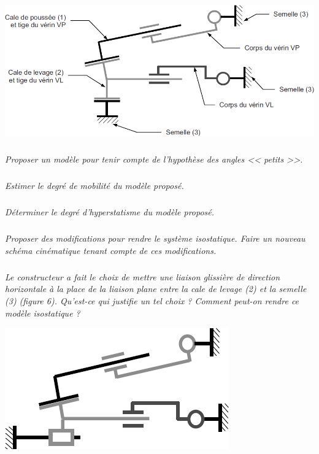 \documentclass[10pt,fleqn]{article} %
\begin{document}
\begin{multicols}{2}
\begin{center}
\includegraphics[width=\linewidth]{images/viaduc_03.png}
\end{center}

\subparagraph{}
\textit{Proposer un modèle pour tenir compte de l'hypothèse des angles << petits >>.}
\ifprof
\begin{corrige}
\end{corrige}\else\fi

\subparagraph{}
\textit{Estimer le degré de mobilité du modèle proposé.}
\ifprof
\begin{corrige}
\end{corrige}\else\fi


\subparagraph{}
\textit{Déterminer le degré d’hyperstatisme du modèle proposé.}
\ifprof
\begin{corrige}
\end{corrige}\else\fi


\subparagraph{}
\textit{Proposer des modifications pour rendre le système isostatique. Faire un
nouveau schéma cinématique tenant compte de ces modifications.}
\ifprof
\begin{corrige}
\end{corrige}\else\fi


\subparagraph{}
\textit{Le constructeur a fait le choix de mettre
une liaison glissière de direction horizontale à la place de
la liaison plane entre la cale de levage (2) et la semelle (3)
(figure 6). Qu’est-ce qui justifie un tel choix ? Comment
peut-on rendre ce modèle isostatique ?}
\ifprof
\begin{corrige}
\end{corrige}\else\fi

\begin{center}
\includegraphics[width=.8\linewidth]{images/viaduc_04.png}
\end{center}




\end{multicols}
\end{document}

